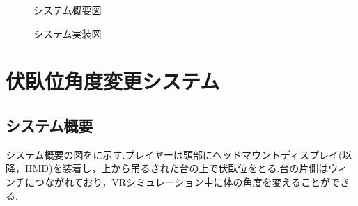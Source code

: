 \documentclass[uplatex]{jsarticle}
\begin{document}
 \begin{figure}[tb]
  \centering
  \caption{システム概要図}
  \label{fig:about_system}

  \centering
  \caption{システム実装図}
  \label{fig:build_system}

\end{figure}

\section{伏臥位角度変更システム}
\subsection{システム概要}
システム概要の図をに示す.プレイヤーは頭部にヘッドマウントディスプレイ(以降，HMD)を装着し，上から吊るされた台の上で伏臥位をとる.台の片側はウィンチにつながれており，VRシミュレーション中に体の角度を変えることができる.
\end{document}
